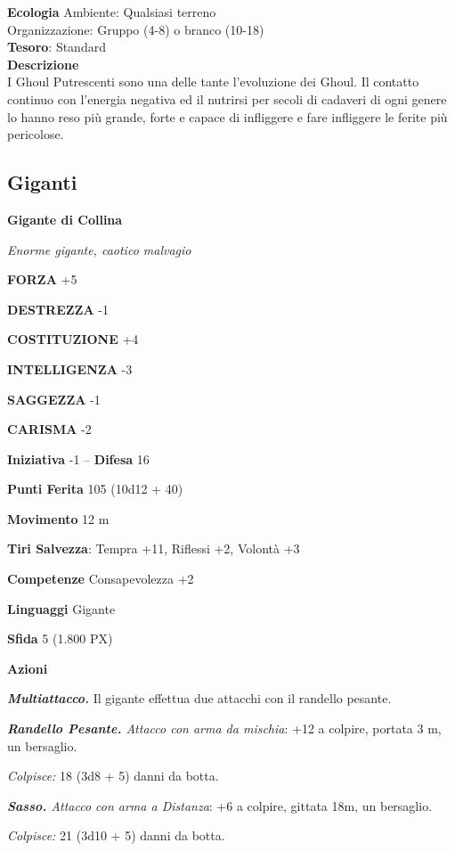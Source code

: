 \begin{multicols}{2}
\textbf{Ecologia}
Ambiente: Qualsiasi terreno\\
Organizzazione: Gruppo (4-8) o branco (10-18)\\
\textbf{Tesoro}: Standard\\
\textbf{Descrizione}\\
I Ghoul Putrescenti sono una delle tante l'evoluzione dei Ghoul. Il contatto continuo con l'energia negativa ed il nutrirsi per secoli di cadaveri di ogni genere lo hanno reso più grande, forte e capace di infliggere e fare infliggere le ferite più pericolose.


\subsection{Giganti}

\medskip{}\textbf{Gigante di Collina}

\textit{Enorme gigante, caotico malvagio}

\textbf{FORZA} +5

\textbf{DESTREZZA} -1

\textbf{COSTITUZIONE} +4

\textbf{INTELLIGENZA} -3

\textbf{SAGGEZZA} -1

\textbf{CARISMA} -2

\textbf{Iniziativa} -1 -- \textbf{Difesa} 16

\textbf{Punti Ferita} 105 (10d12 + 40)

\textbf{Movimento} 12 m

\textbf{Tiri Salvezza}: Tempra +11, Riflessi +2, Volontà +3

\textbf{Competenze} Consapevolezza +2

\textbf{Linguaggi} Gigante

\textbf{Sfida} 5 (1.800 PX)

\textbf{Azioni}

\textit{\textbf{Multiattacco.}} Il gigante effettua due attacchi con il randello pesante.

\textit{\textbf{Randello Pesante.} Attacco con arma da mischia}: +12 a colpire, portata 3 m, un bersaglio.

\textit{Colpisce:} 18 (3d8 + 5) danni da botta.

\textit{\textbf{Sasso.} Attacco con arma a Distanza}: +6 a colpire, gittata 18m, un bersaglio.

\textit{Colpisce:} 21 (3d10 + 5) danni da botta.


\end{multicols}

